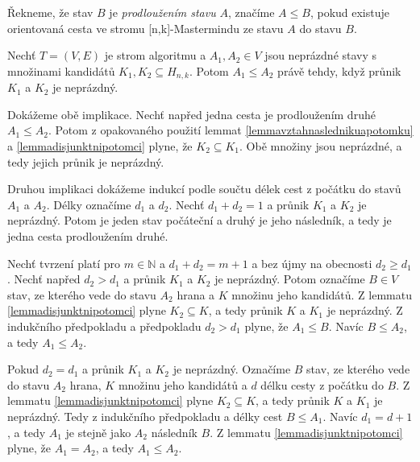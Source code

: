 \begin{definice}
    Řekneme, že stav $B$ je \emph{prodloužením stavu} $A$, značíme $A \leq B$, pokud existuje orientovaná cesta ve stromu [n,k]-Mastermindu ze stavu $A$ do stavu $B$. 
\end{definice}


\begin{lemma}\label{lemmaprunikacestastromalg}
    Nechť $T = (V,E)$ je strom algoritmu a $A_1, A_2 \in V$ jsou neprázdné stavy s množinami kandidátů $K_1, K_2 \subseteq H_{n,k}$. Potom $A_1 \leq A_2$ právě tehdy, když průnik $K_1$ a $K_2$ je neprázdný.
\end{lemma}
\begin{dukaz}
    Dokážeme obě implikace. Nechť napřed jedna cesta je prodloužením druhé $A_1 \leq A_2$. Potom z opakovaného použití lemmat \ref{lemmavztahnaslednikuapotomku} a \ref{lemmadisjunktnipotomci} plyne, že $K_2 \subseteq K_1$. Obě množiny jsou neprázdné, a tedy jejich průnik je neprázdný. 

    Druhou implikaci dokážeme indukcí podle součtu délek cest z počátku do stavů $A_1$ a $A_2$. Délky označíme $d_1$ a $d_2$. Nechť $d_1 + d_2 = 1$ a průnik $K_1$ a $K_2$ je neprázdný. Potom je jeden stav počáteční a druhý je jeho následník, a tedy je jedna cesta prodloužením druhé.


    Nechť tvrzení platí pro $m \in \mathbb{N}$ a $d_1 + d_2 = m+1$ a bez újmy na obecnosti $d_2 \geq d_1$. Nechť napřed $d_2 > d_1$ a průnik $K_1$ a $K_2$ je neprázdný. Potom označíme $B \in V$ stav, ze kterého vede do stavu $A_2$ hrana a $K$ množinu jeho kandidátů. Z lemmatu \ref{lemmadisjunktnipotomci} plyne $K_2 \subseteq K$, a tedy průnik $K$ a $K_1$ je neprázdný. Z indukčního předpokladu a předpokladu $d_2 > d_1$ plyne, že $A_1 \leq B$. Navíc $B\leq A_2$, a tedy $A_1 \leq A_2$. 

    Pokud $d_2 = d_1$ a průnik $K_1$ a $K_2$ je neprázdný. Označíme $B$ stav, ze kterého vede do stavu $A_2$ hrana, $K$ množinu jeho kandidátů a $d$ délku cesty z počátku do $B$. Z lemmatu \ref{lemmadisjunktnipotomci} plyne $K_2 \subseteq K$, a tedy průnik $K$ a $K_1$ je neprázdný. Tedy z indukčního předpokladu a délky cest $B \leq A_1$. Navíc $d_1 = d+1$, a tedy $A_1$ je stejně jako $A_2$ následník $B$. Z lemmatu \ref{lemmadisjunktnipotomci} plyne, že $A_1 = A_2$, a tedy $A_1 \leq A_2$. 
\end{dukaz}


